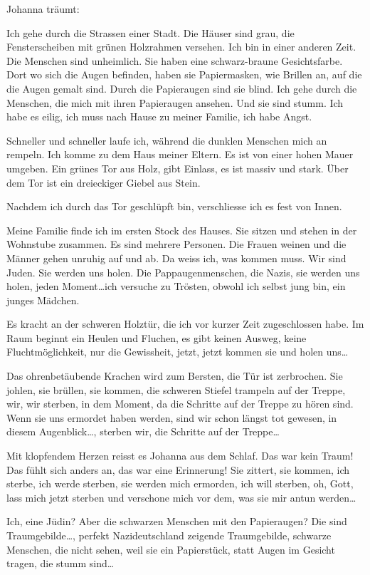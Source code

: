 \documentclass[10pt,titlepage,a5paper]{book}
\begin{document}
Johanna träumt:

Ich gehe durch die Strassen einer Stadt. Die Häuser sind grau, die Fensterscheiben mit grünen Holzrahmen versehen. Ich bin in einer anderen Zeit. Die Menschen sind unheimlich. Sie haben eine schwarz-braune Gesichtsfarbe. Dort wo sich die Augen befinden, haben sie Papiermasken, wie Brillen an, auf die die Augen gemalt sind. Durch die Papieraugen sind sie blind. Ich gehe durch die Menschen,  die mich mit ihren Papieraugen ansehen. Und sie sind stumm. Ich habe es eilig, ich muss nach Hause zu meiner Familie, ich habe Angst.

Schneller und schneller laufe ich, während die dunklen Menschen mich an rempeln. Ich komme zu dem Haus meiner Eltern. Es ist von einer hohen Mauer umgeben. Ein grünes Tor aus Holz, gibt Einlass, es ist massiv und stark. Über dem Tor ist ein dreieckiger Giebel aus Stein. 

Nachdem ich durch das Tor geschlüpft bin, verschliesse ich es fest von Innen. 

Meine Familie finde ich im ersten Stock des Hauses. Sie sitzen und stehen in der Wohnstube zusammen. Es sind mehrere Personen. Die Frauen weinen und die Männer gehen unruhig auf und ab. Da weiss ich, was kommen muss. Wir sind Juden. Sie werden uns holen. Die Pappaugenmenschen, die Nazis, sie werden uns holen, jeden Moment\dots  ich versuche zu Trösten, obwohl ich selbst jung bin, ein junges Mädchen.

Es kracht an der schweren Holztür, die ich vor kurzer Zeit zugeschlossen habe. Im Raum beginnt ein Heulen und Fluchen, es gibt keinen Ausweg, keine Fluchtmöglichkeit, nur die Gewissheit, jetzt, jetzt kommen sie und holen uns\dots 

Das ohrenbetäubende Krachen wird zum Bersten, die Tür ist zerbrochen. Sie johlen, sie brüllen, sie kommen, die schweren Stiefel trampeln auf der Treppe, wir, wir sterben, in dem Moment, da die Schritte auf der Treppe zu hören sind. Wenn sie uns ermordet haben werden, sind wir schon längst tot gewesen, in diesem Augenblick\dots , sterben wir, die Schritte auf der Treppe\dots 

Mit klopfendem Herzen reisst es Johanna aus dem Schlaf. Das war kein Traum! Das fühlt sich anders an, das war eine Erinnerung! Sie zittert, sie kommen, ich sterbe, ich werde sterben, sie werden mich ermorden, ich will sterben, oh, Gott, lass mich jetzt sterben und verschone mich vor dem, was sie mir antun werden\dots 

Ich, eine Jüdin? Aber die schwarzen Menschen mit den Papieraugen? Die sind Traumgebilde\dots , perfekt Nazideutschland zeigende Traumgebilde, schwarze Menschen, die nicht sehen, weil sie ein Papierstück, statt Augen im Gesicht tragen, die stumm sind\dots 
\end{document}
